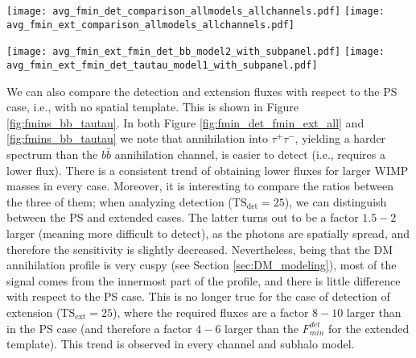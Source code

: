 \documentclass[%
 reprint,
nofootinbib,
 amsmath,amssymb,
 aps,
]{revtex4-2}
\begin{document}
\begin{figure*}[!ht]
\centering
\texttt{[image: avg\_fmin\_det\_comparison\_allmodels\_allchannels.pdf]}
\texttt{[image: avg\_fmin\_ext\_comparison\_allmodels\_allchannels.pdf]}
\caption{Comparison between minimum fluxes for extended subhalos {as a function of the mass of the DM candidate}. {Left panel:} Minimum flux for detection ($\mathrm{TS_{det}=25}$), for the two considered annihilation channels and subhalo models. {Right panel:} The same for the case of minimum flux for extension ($\mathrm{TS_{ext}=25}$). The uncertainty bars come from averaging across ten realization {of the same simulation setup}. Note the different flux scale in each panel.}
\label{fig:fmin_det_fmin_ext_all}
\end{figure*}

\begin{figure*}[!ht]
\centering
\texttt{[image: avg\_fmin\_ext\_fmin\_det\_bb\_model2\_with\_subpanel.pdf]}
\texttt{[image: avg\_fmin\_ext\_fmin\_det\_tautau\_model1\_with\_subpanel.pdf]}
\caption{  Minimum fluxes for point-source detection ($\mathrm{TS_{det}}=25$; PS $F_{min}^{det}$), extended subhalo detection ($\mathrm{TS_{det}}=25$; $F_{min}^{det}$), and detection of extension ($\mathrm{TS_{ext}}=25$; $F_{min}^{ext}$), for $b\bar{b}$ (left panel) and $\tau^+\tau^-$ (right panel) annihilation channels. Lower panels show the ratio between $F_{min}^{det}$ (green squares) and $F_{min}^{ext}$ (red circles) when compared to the point-source detection threshold (PS $F_{min}^{det}$).}
\label{fig:fmins_bb_tautau}
\end{figure*}

We can also compare the detection and extension fluxes with respect to the PS case, i.e., with no spatial template. This is shown in Figure \ref{fig:fmins_bb_tautau}. In both Figure \ref{fig:fmin_det_fmin_ext_all} and \ref{fig:fmins_bb_tautau} we note that annihilation into $\tau^+\tau^-$, yielding a harder spectrum than the $b\bar{b}$ annihilation channel, is easier to detect (i.e., requires a lower flux). There is a consistent trend of obtaining lower fluxes for larger WIMP masses in every case. Moreover, it is interesting to compare the ratios between the three of them; when analyzing detection ($\mathrm{TS_{det}=25}$), we can distinguish between the PS and extended cases. The latter turns out to be a factor $1.5-2$ larger (meaning more difficult to detect), as the photons are spatially spread, and therefore the sensitivity is slightly decreased. Nevertheless, being that the DM annihilation profile is very cuspy (see Section \ref{sec:DM_modeling}), most of the signal comes from the innermost part of the profile, and there is little difference with respect to the PS case. This is no longer true for the case of detection of extension ($\mathrm{TS_{ext}}=25$), where the required fluxes are a factor $8-10$ larger than in the PS case (and therefore a factor $4-6$ larger than the $F_{min}^{det}$ for the extended template). This trend is observed in every channel and subhalo model.
\end{document}
